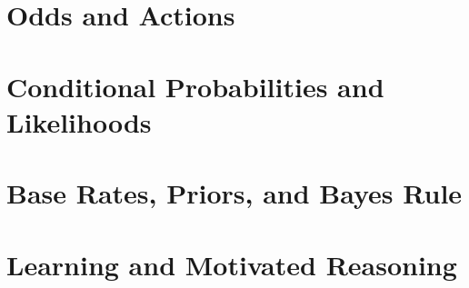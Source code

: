 \documentclass[]{tufte-book}
\begin{document}
\hypertarget{odds-and-actions}{%
\chapter{Odds and Actions}\label{odds-and-actions}}

\hypertarget{conditional-probabilities-and-likelihoods}{%
\chapter{Conditional Probabilities and Likelihoods}\label{conditional-probabilities-and-likelihoods}}

\hypertarget{base-rates-priors-and-bayes-rule}{%
\chapter{Base Rates, Priors, and Bayes Rule}\label{base-rates-priors-and-bayes-rule}}

\hypertarget{learning-and-motivated-reasoning}{%
\chapter{Learning and Motivated Reasoning}\label{learning-and-motivated-reasoning}}
\end{document}
